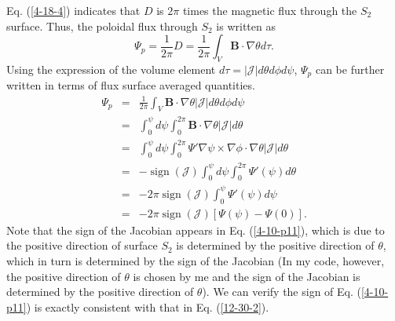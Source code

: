 \documentclass{llncs}
\newcommand{\tmop}[1]{\ensuremath{\operatorname{#1}}}
\begin{document}
Eq. (\ref{4-18-4}) indicates that $D$ is $2 \pi$ times the magnetic flux
through the $S_2$ surface. Thus, the poloidal flux through $S_2$ is written as
\begin{equation}
  \Psi_p = \frac{1}{2 \pi} D = \frac{1}{2 \pi} \int_V \mathbf{B} \cdot \nabla
  \theta d \tau .
\end{equation}
Using the expression of the volume element $d \tau = |\mathcal{J}| d \theta d
\phi d \psi$, $\Psi_p$ can be further written in terms of flux surface
averaged quantities.
\begin{eqnarray}
  \Psi_p & = & \frac{1}{2 \pi} \int_V \mathbf{B} \cdot \nabla \theta
  |\mathcal{J}| d \theta d \phi d \psi \nonumber\\
  & = & \int_0^{\psi} d \psi \int_0^{2 \pi} \mathbf{B} \cdot \nabla \theta
  |\mathcal{J}| d \theta \nonumber\\
  & = & \int_0^{\psi} d \psi \int_0^{2 \pi} \Psi' \nabla \psi \times \nabla
  \phi \cdot \nabla \theta |\mathcal{J}| d \theta \nonumber\\
  & = & - \tmop{sign} (\mathcal{J}) \int_0^{\psi} d \psi \int_0^{2 \pi} \Psi'
  (\psi) d \theta \nonumber\\
  & = & - 2 \pi \tmop{sign} (\mathcal{J}) \int_0^{\psi} \Psi' (\psi) d \psi
  \nonumber\\
  & = & - 2 \pi \tmop{sign} (\mathcal{J}) [\Psi (\psi) - \Psi (0)] . 
  \label{4-10-p11}
\end{eqnarray}
Note that the sign of the Jacobian appears in Eq. (\ref{4-10-p11}), which is
due to the positive direction of surface $S_2$ is determined by the positive
direction of $\theta$, which in turn is determined by the sign of the Jacobian
(In my code, however, the positive direction of $\theta$ is chosen by me and
the sign of the Jacobian is determined by the positive direction of $\theta$).
We can verify the sign of Eq. (\ref{4-10-p11}) is exactly consistent with that
in Eq. (\ref{12-30-2}).
\end{document}
